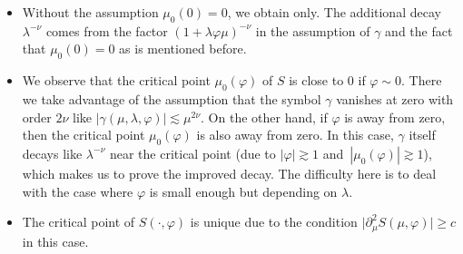 \documentclass[pdftex]{sigma}
\numberwithin{equation}{section}
\def\c{\gamma}
\def\f{\varphi}
\def\l{\lambda}
\def\m{\mu}
\def\n{\nu}
\def\pa{\partial}
\begin{document}
\begin{Remark}\quad
\begin{itemize}\itemsep=0pt
\item[(1)] Without the assumption $\m_0(0)=0$, we obtain \smash{$I(\l,\f)\lesssim \l^{-\frac{1}{2}}$} only. The additional decay~$\l^{-\n}$ comes from the factor $(1+\l \f\m)^{-\n}$ in the assumption of $\c$ and the fact that $\m_0(0)=0$ as is mentioned before.

\item[(2)] We observe that the critical point $\m_0(\f)$ of $S$ is close to $0$ if $\f\sim 0$. There we take advantage of the assumption that the symbol $\c$ vanishes at zero with order $2\n$ like $|\c(\m,\l,\f)|\lesssim \m^{2\n}$. On the other hand, if $\f$ is away from zero, then the critical point $\m_0(\f)$ is also away from zero. In this case, $\c$ itself decays like $\l^{-\n}$ near the critical point (due to $|\f|\gtrsim 1$ and~${|\m_0(\f)|\gtrsim 1}$), which makes us to prove the improved decay. The difficulty here is to deal with the case where $\f$ is small enough but depending on $\l$.

\item[(3)]
The critical point of $S(\cdot,\f)$ is unique due to the condition $\big|\pa_{\m}^2S(\m,\f)\big|\geq c$ in this case.
\end{itemize}
\end{Remark}
\end{document}
